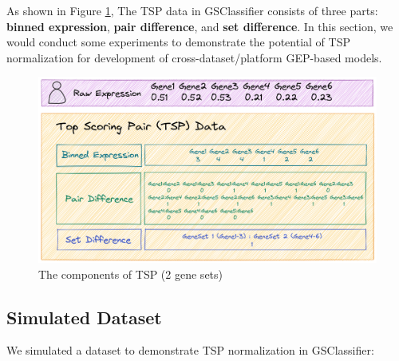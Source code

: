 \documentclass[
  12pt,
]{book}
\begin{document}
As shown in Figure \ref{fig:tsp}, The TSP data in GSClassifier consists of three parts: \textbf{binned expression}, \textbf{pair difference}, and \textbf{set difference}. In this section, we would conduct some experiments to demonstrate the potential of TSP normalization for development of cross-dataset/platform GEP-based models.

\begin{figure}

{\centering \includegraphics[width=0.85\linewidth]{./fig/TSP} 

}

\caption{The components of TSP (2 gene sets)}\label{fig:tsp}
\end{figure}

\hypertarget{simulated-dataset}{%
\subsection{Simulated Dataset}\label{simulated-dataset}}

We simulated a dataset to demonstrate TSP normalization in GSClassifier:
\end{document}
